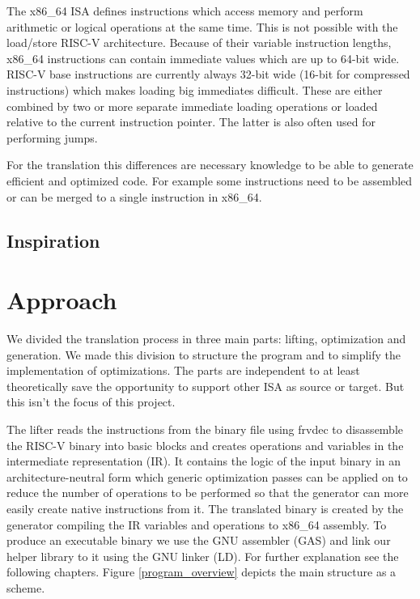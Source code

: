 \documentclass[course=eragp]{aspdoc}
\begin{document}
\par

The x86\_64 ISA defines instructions which access memory and perform arithmetic or logical
operations at the same time. This is not possible with the load/store RISC-V architecture. Because
of their variable instruction lengths, x86\_64 instructions can contain immediate values which are
up to 64-bit wide.\cite[Vol.~2B~p.~4-35]{intel2017man} RISC-V base instructions are currently always
32-bit wide (16-bit for compressed instructions)\cite[p.~8]{rvspec} which makes loading big
immediates difficult. These are either combined by two or more separate immediate loading operations
or loaded relative to the current instruction pointer.\cite[p.~19]{rvspec} The latter is also often
used for performing jumps.\cite [p.~20]{rvspec}

\par

For the translation this differences are necessary knowledge to be able to generate efficient and optimized code.
For example some instructions need to be assembled or can be merged to a single instruction in x86\_64.

\subsection{Inspiration}

\section{Approach}

We divided the translation process in three main parts: lifting, optimization and generation. We
made this division to structure the program and to simplify the implementation of optimizations.
The parts are independent to at least theoretically save the opportunity to support other ISA as
source or target. But this isn't the focus of this project.

\par

The lifter reads the instructions from the binary file using frvdec\cite{frvdec} to disassemble the
RISC-V binary into basic blocks and creates operations and variables in the intermediate representation (IR).
It contains the logic of the input binary in an architecture-neutral form which generic optimization passes can
be applied on to reduce the number of operations to be performed so that the generator can more easily create native instructions from it.
The translated binary is created by the generator compiling the IR variables and operations to x86\_64 assembly. To produce an executable binary we use the GNU
assembler (GAS)\cite{gnu_binutils} and link our helper library to it using the GNU linker
(LD)\cite{gnu_binutils}. For further explanation see the following chapters. Figure
\ref{program_overview} depicts the main structure as a scheme.
\end{document}
